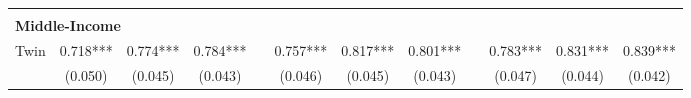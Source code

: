 \begin{table}[htpb!]
\begin{center}
{\begin{tabular}{lcccp{2mm}cccp{2mm}ccc}
\begin{footnotesize}\end{footnotesize}&\begin{footnotesize}\end{footnotesize}&\begin{footnotesize}\end{footnotesize}&\begin{footnotesize}\end{footnotesize}&\begin{footnotesize}\end{footnotesize}&\begin{footnotesize}\end{footnotesize}&\begin{footnotesize}\end{footnotesize}&\begin{footnotesize}\end{footnotesize}&\begin{footnotesize}\end{footnotesize}&\begin{footnotesize}\end{footnotesize}&\begin{footnotesize}\end{footnotesize}&\begin{footnotesize}\end{footnotesize}\\\multicolumn{12}{l}{\textbf{Middle-Income}}\\ 
Twin&0.718***&0.774***&0.784***&&0.757***&0.817***&0.801***&&0.783***&0.831***&0.839***\\
&(0.050)&(0.045)&(0.043)&&(0.046)&(0.045)&(0.043)&&(0.047)&(0.044)&(0.042)\\

\end{tabular}}
\end{center}
\end{table}
